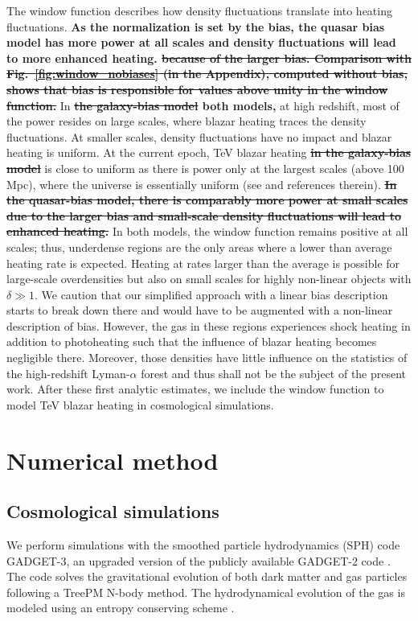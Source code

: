 \documentclass[numberedappendix]{emulateapj}
\newcommand\ALc[1]{{\color{red} \bf #1}} %
\begin{document}
The window function describes how density fluctuations translate into heating fluctuations. \ALc{As the normalization is set  by the bias, the quasar bias model has more power at all scales and density fluctuations will lead to more enhanced heating. \sout{
 because of the larger bias. Comparison with Fig.~\ref{fig:window_nobiases} (in the Appendix), computed without bias, shows that bias is responsible for values above unity in the window function.}} In \ALc{\sout{the galaxy-bias model} both models,} at high redshift, most of the power resides on large scales, where blazar heating traces the density fluctuations. At smaller scales, density fluctuations have no impact and blazar heating is uniform. At the current epoch, TeV blazar heating \ALc{\sout{in the galaxy-bias model}} is close to uniform as there is power only at the largest scales (above 100 Mpc), where the universe is essentially uniform (see \citet{2013MNRAS.429.2910C} and references therein). \ALc{\sout{In the quasar-bias model, there is comparably more power at small scales due to the larger bias and small-scale density fluctuations will lead to enhanced heating.}} In both models, the window function remains positive at all scales; thus, underdense regions are the only areas where a lower than average heating rate is expected. Heating at rates larger than the average is possible for large-scale overdensities but also on small scales for highly non-linear objects with $\delta\gg1$. We caution that our simplified approach with a linear bias description starts to break down there and would have to be augmented with a non-linear description of bias. However, the gas in these regions experiences shock heating in addition to photoheating such that the influence of blazar heating becomes negligible there. Moreover, those densities have little influence on the statistics of the high-redshift Lyman-$\alpha$ forest and thus shall not be the subject of the present work. After these first analytic estimates, we include the window function to model TeV blazar heating in cosmological simulations.

\section{Numerical method}
\subsection{Cosmological simulations}
We perform simulations with the smoothed particle hydrodynamics (SPH) code \textsc{GADGET-3}, an upgraded version of the publicly available \textsc{GADGET-2} code \citep{2005MNRAS.364.1105S}. The code solves the gravitational evolution of both dark matter and gas particles following a TreePM N-body method. The hydrodynamical evolution of the gas is modeled using an entropy conserving scheme \citep{2002MNRAS.333..649S}.
\end{document}
